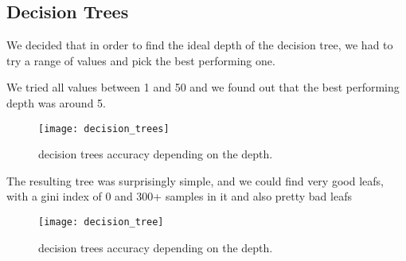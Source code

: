 
\subsection{Decision Trees}%
\label{sub:decision-trees}
We decided that in order to find the ideal depth of the decision tree, we had to try a range of values and pick the best performing one.

We tried all values between 1 and 50 and we found out that the best performing depth was around 5. 

\begin{figure}[H]
    \centering
    \texttt{[image: decision\_trees]}
    \caption{decision trees accuracy depending on the depth.}%
    \label{fig:decision_trees_acc}
\end{figure}

The resulting tree was surprisingly simple, and we could find very good leafs, with a gini index of 0 and 300+ samples in it and also pretty bad leafs

\begin{figure}[H]
    \centering
    \texttt{[image: decision\_tree]}
    \caption{decision trees accuracy depending on the depth.}%
    \label{fig:decision_trees}
\end{figure}

